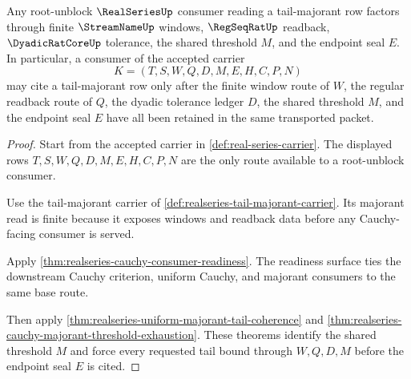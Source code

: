 \begin{theorem}
\label{thm:realseries-root-tail-majorant-window}
Any root-unblock $\RealSeriesUp$ consumer reading a tail-majorant row factors through finite $\StreamNameUp$ windows, $\RegSeqRatUp$ readback, $\DyadicRatCoreUp$ tolerance, the shared threshold $M$, and the endpoint seal $E$. In particular, a consumer of the accepted carrier
$$
K=(T,S,W,Q,D,M,E,H,C,P,N)
$$
may cite a tail-majorant row only after the finite window route of $W$, the regular readback route of $Q$, the dyadic tolerance ledger $D$, the shared threshold $M$, and the endpoint seal $E$ have all been retained in the same transported packet.
\end{theorem}
\begin{proof}
Start from the accepted carrier in \autoref{def:real-series-carrier}. The displayed rows $T,S,W,Q,D,M,E,H,C,P,N$ are the only route available to a root-unblock consumer.

Use the tail-majorant carrier of \autoref{def:realseries-tail-majorant-carrier}. Its majorant read is finite because it exposes windows and readback data before any Cauchy-facing consumer is served.

Apply \autoref{thm:realseries-cauchy-consumer-readiness}. The readiness surface ties the downstream Cauchy criterion, uniform Cauchy, and majorant consumers to the same base route.

Then apply \autoref{thm:realseries-uniform-majorant-tail-coherence} and \autoref{thm:realseries-cauchy-majorant-threshold-exhaustion}. These theorems identify the shared threshold $M$ and force every requested tail bound through $W,Q,D,M$ before the endpoint seal $E$ is cited.
\end{proof}

